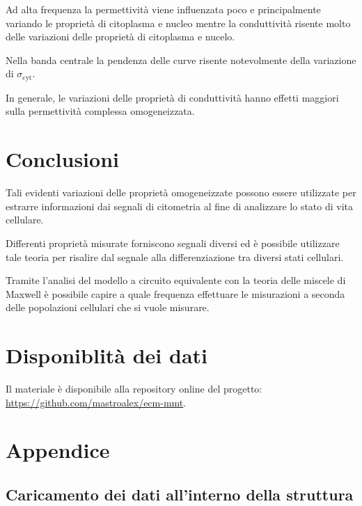 Ad alta frequenza la permettività viene influenzata poco e principalmente variando le proprietà di citoplasma e nucleo mentre la conduttività risente molto delle variazioni delle proprietà di citoplasma e nucelo.

Nella banda centrale la pendenza delle curve risente notevolmente della variazione di $\sigma_{\operatorname{cyt}}$.

In generale, le variazioni delle proprietà di conduttività hanno effetti maggiori sulla permettività complessa omogeneizzata.
	
	
\section{Conclusioni}


Tali evidenti variazioni delle proprietà omogeneizzate possono essere utilizzate per estrarre informazioni dai segnali di citometria al fine di analizzare lo stato di vita cellulare.

Differenti proprietà misurate forniscono segnali diversi ed è possibile utilizzare tale teoria per risalire dal segnale alla differenziazione tra diversi stati cellulari. 

Tramite l'analisi del modello a circuito equivalente con la teoria delle miscele di Maxwell è possibile capire a quale frequenza effettuare le misurazioni a seconda delle popolazioni cellulari che si vuole misurare. 


\raggedbottom


\raggedbottom
\pagebreak
\section*{Disponiblità dei dati}

Il materiale è disponibile alla repository online del progetto: \url{https://github.com/mastroalex/ecm-mmt}.

\printbibliography[title=Riferimenti]

\clearpage
\onecolumn
\section*{Appendice}

\subsection*{Caricamento dei dati all'interno della struttura}

